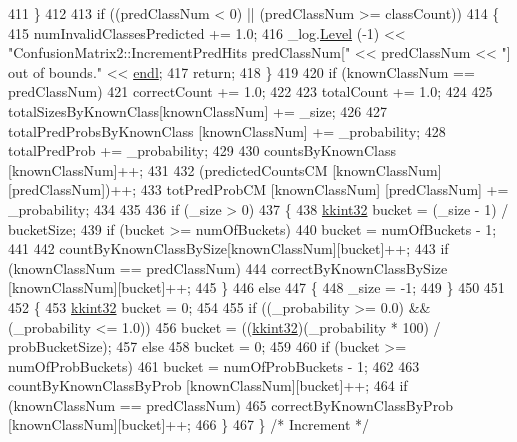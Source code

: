 \begin{DoxyCode}
411   \}
412 
413   \textcolor{keywordflow}{if}  ((predClassNum < 0)  ||  (predClassNum >= classCount))
414   \{
415     numInvalidClassesPredicted += 1.0;
416     \_log.\hyperlink{class_k_k_b_1_1_run_log_a32cf761d7f2e747465fd80533fdbb659}{Level} (-1) << \textcolor{stringliteral}{"ConfusionMatrix2::IncrementPredHits    predClassNum["} << predClassNum << \textcolor{stringliteral}{"]
       out of bounds."} << \hyperlink{namespace_k_k_b_ad1f50f65af6adc8fa9e6f62d007818a8}{endl};
417     \textcolor{keywordflow}{return};
418   \}
419 
420   \textcolor{keywordflow}{if}  (knownClassNum == predClassNum)
421      correctCount += 1.0;
422 
423   totalCount += 1.0;
424 
425   totalSizesByKnownClass[knownClassNum] += \_size;
426 
427   totalPredProbsByKnownClass [knownClassNum] += \_probability;
428   totalPredProb                              += \_probability;
429 
430   countsByKnownClass [knownClassNum]++;
431 
432   (predictedCountsCM [knownClassNum] [predClassNum])++;
433   totPredProbCM      [knownClassNum] [predClassNum] += \_probability;
434 
435 
436   \textcolor{keywordflow}{if}  (\_size > 0)
437   \{
438     \hyperlink{namespace_k_k_b_a8fa4952cc84fda1de4bec1fbdd8d5b1b}{kkint32}  bucket = (\_size - 1) / bucketSize;
439     \textcolor{keywordflow}{if}  (bucket >= numOfBuckets)
440       bucket = numOfBuckets - 1;
441 
442     countByKnownClassBySize[knownClassNum][bucket]++;
443     \textcolor{keywordflow}{if}  (knownClassNum == predClassNum)
444       correctByKnownClassBySize [knownClassNum][bucket]++;
445   \}
446   \textcolor{keywordflow}{else}
447   \{
448     \_size = -1;
449   \}
450 
451 
452   \{
453      \hyperlink{namespace_k_k_b_a8fa4952cc84fda1de4bec1fbdd8d5b1b}{kkint32}  bucket = 0;
454      
455      \textcolor{keywordflow}{if}  ((\_probability >= 0.0)  &&  (\_probability <= 1.0))
456        bucket = ((\hyperlink{namespace_k_k_b_a8fa4952cc84fda1de4bec1fbdd8d5b1b}{kkint32})(\_probability * 100) / probBucketSize);
457      \textcolor{keywordflow}{else}
458        bucket = 0;
459 
460      \textcolor{keywordflow}{if}  (bucket >= numOfProbBuckets)
461        bucket = numOfProbBuckets - 1;
462 
463      countByKnownClassByProb [knownClassNum][bucket]++;
464     \textcolor{keywordflow}{if}  (knownClassNum == predClassNum)
465       correctByKnownClassByProb [knownClassNum][bucket]++;
466   \}
467 \}  \textcolor{comment}{/* Increment */}
\end{DoxyCode}
